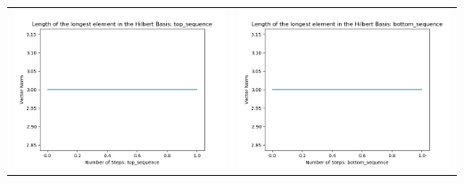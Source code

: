 \documentclass[10pt]{article}
\begin{document}
\begin{tabular}{c|c}
\begin{minipage}{.4\textwidth}
\includegraphics[width=\textwidth]{"DATA/5d/6 generators 1 bound H/top_sequence LENGTH"}
\end{minipage} &
\begin{minipage}{.4\textwidth}
\includegraphics[width=\textwidth]{"DATA/5d/6 generators 1 bound H bottomup/bottom_sequence LENGTH"}
\end{minipage}
\end{tabular}
\end{document}
